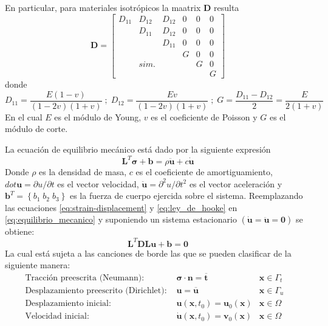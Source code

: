En particular, para materiales isotrópicos la maatrix $\bm{D}$ resulta
\begin{equation}
    \bm{D} = \begin{bmatrix}
        D_{11} & D_{12} & D_{12} & 0 & 0 & 0 \\
               & D_{11} & D_{12} & 0 & 0 & 0 \\
               &        & D_{11} & 0 & 0 & 0 \\
               &        &        & G & 0 & 0 \\
               &  sim.  &        & & G & 0 \\
               &        &        & & & G
             \end{bmatrix}
\end{equation}
donde
\begin{equation}
    D_{11} = \frac{E(1-v)}{(1-2v)(1+v)} \; ; \; D_{12} = \frac{Ev}{(1-2v)(1+v)} \; ; \; G = \frac{D_{11}-D_{12}}{2} = \frac{E}{2(1+v)}
\end{equation}
En el cual $E$ es el módulo de Young, $v$ es el coeficiente de Poisson y $G$ es el módulo de corte.

La ecuación de equilibrio mecánico está dado por la siguiente expresión
\begin{equation} \label{eq:equilibrio_mecanico}
    \bm{L}^T \bm{\sigma} + \bm{b} = \rho \ddot{\bm{u}} + c \dot{\bm{u}}
\end{equation}
Donde $\rho$ es la densidad de masa, $c$ es el coeficiente de amortiguamiento, $dot{\bm{u}} = \partial u/\partial t$ es el vector velocidad, $\ddot{\bm{u}} = \partial^2 u/\partial t^2$ es el vector aceleración y $\bm{b}^T = \left\{ b_1 \; b_2 \; b_3 \right\}$ es la fuerza de cuerpo ejercida sobre el sistema. Reemplazando las ecuaciones \ref{eq:strain-displacement} y \ref{eq:ley_de_hooke} en \ref{eq:equilibrio_mecanico} y suponiendo un sistema estacionario $(\dot{\bm{u}} = \ddot{\bm{u}} = \bm{0})$  se obtiene:
\begin{equation}
    \bm{L}^T \bm{D} \bm{L} \bm{u} + \bm{b} = \bm{0}
\end{equation}
La cual está sujeta a las canciones de borde las que se pueden clasificar de la siguiente manera:
\begin{align}
    \mbox{Tracción preescrita (Neumann): } & \bm{\sigma} \cdot \bm{n} = \overline{\bm{t}} & \bm{x} \in \Gamma_t &  \\
    \mbox{Desplazamiento preescrito (Dirichlet): } & \bm{u} = \overline{\bm{u}} & \bm{x} \in \Gamma_u &  \\
    \mbox{Desplazamiento inicial: } & \bm{u}(\bm{x},t_0) = \bm{u}_0 (\bm{x}) & \bm{x} \in \Omega &  \\
    \mbox{Velocidad inicial: } & \dot{\bm{u}}(\bm{x},t_0) = \bm{v}_0 (\bm{x}) & \bm{x} \in \Omega &
\end{align}



